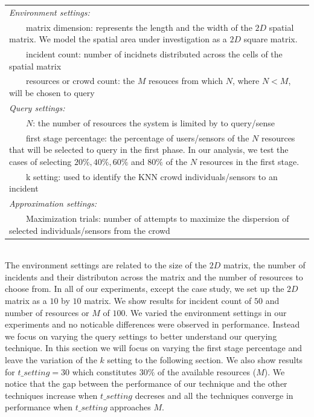 \documentclass{acm_proc_article-sp}
\newcommand{\tabitem}{~~\llap{\textbullet}~~}
\begin{document}
\begin{tabulary}{0.5\textwidth}{|L|}
\hline
\textit{Environment settings: }\\
\tabitem matrix dimension: represents the length and 
the width of the $2D$ spatial matrix. We model the spatial area under investigation as a $2D$ square matrix.\\
\tabitem incident count: number of incidnets distributed across the cells of the spatial matrix\\
\tabitem resources or crowd count: the $M$ resouces from which $N$, where $N < M$, will be chosen to query\\
\hline
\textit{Query settings:}\\
\tabitem $N$: the number of resources the system is limited by to query/sense \\
\tabitem first stage percentage: the percentage of users/sensors of the $N$ resources that will be selected to query in the first phase. In our analysis, we test the cases of selecting $20\%, 40\%, 60\%$ and $80\%$ of the $N$ resources in the first stage.\\
\tabitem k setting: used to identify the KNN crowd individuals/sensors to an incident\\
\hline
\textit{Approximation settings: }\\
\tabitem Maximization trials: number of attempts to maximize the dispersion of selected individuals/sensors from the crowd\\
\hline
\end{tabulary}  
\label{table:1}\\

The environment settings are related to the size of the $2D$ matrix, the number of incidents and their distributon across the matrix and the number of resources to choose from. In all of our experiments, except the case study, we set up the $2D$ matrix as a $10$ by $10$ matrix. We show results for incident count of $50$ and  number of resources or $M$ of $100$. We varied the environment settings in our experiments and no noticable differences were observed in performance. Instead we focus on varying the query settings to better understand our querying technique. In this section we will focus on varying the first stage percentage and leave the variation of the $k$ setting to the following section. We also show results for $t\_setting = 30$ which constitutes $30\%$ of the available resources ($M$). We notice that the gap between the performance of our technique and the other techniques increase when $t\_setting$ decreses and all the techniques converge in performance when $t\_setting$ approaches $M$. \par
  
\end{document}
